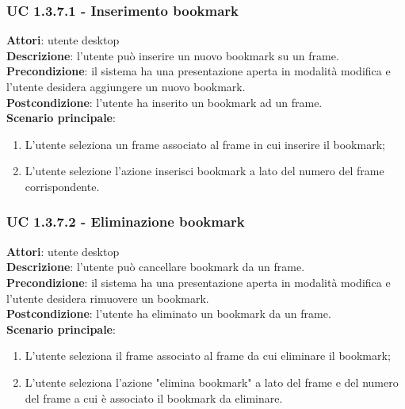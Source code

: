 \subsubsection{UC 1.3.7.1 - Inserimento bookmark}{
	\label{uc1.3.7.1}
	\textbf{Attori}: utente desktop \\
	\textbf{Descrizione}: l'utente può inserire un nuovo bookmark su un frame. \\
	\textbf{Precondizione}: il sistema ha una presentazione aperta in modalità modifica e l'utente desidera aggiungere un nuovo bookmark.	\\
	\textbf{Postcondizione}: l'utente ha inserito un bookmark ad un frame.	\\
	\textbf{Scenario principale}:
	\begin{enumerate}
		\item L'utente seleziona un frame associato al frame in cui inserire il bookmark;
		\item L'utente selezione l'azione inserisci bookmark a lato del numero del frame corrispondente.
	\end{enumerate}
}
\subsubsection{UC 1.3.7.2 - Eliminazione bookmark}{
	\label{uc1.3.7.2}
	\textbf{Attori}: utente desktop \\
	\textbf{Descrizione}: l'utente può cancellare bookmark da un frame. \\
	\textbf{Precondizione}: il sistema ha una presentazione aperta in modalità modifica e l'utente desidera rimuovere un bookmark.	\\
	\textbf{Postcondizione}: l'utente ha eliminato un bookmark da un frame.	\\
	\textbf{Scenario principale}:
	\begin{enumerate}
		\item L'utente seleziona il frame associato al frame da cui eliminare il bookmark;
		\item L'utente seleziona l'azione "elimina bookmark" a lato del frame e del numero del frame a cui è associato il bookmark da eliminare.
	\end{enumerate}
}
